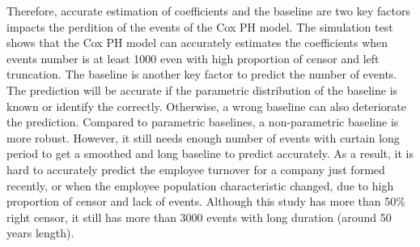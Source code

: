\documentclass[12pt,letterpaper]{article}
\begin{document}
Therefore, accurate estimation of coefficients and the baseline are two key factors impacts the perdition of the events of the Cox PH model. The simulation test shows that the Cox PH model can accurately estimates the coefficients when events number is at least 1000 even with high proportion of censor and left truncation. The baseline is another key factor to predict the number of events. The prediction will be accurate if the parametric distribution of the baseline is known or identify the correctly. Otherwise, a wrong baseline can also deteriorate the prediction. Compared to parametric baselines, a non-parametric baseline is more robust. However, it still needs enough number of events with curtain long period to get a smoothed and long baseline to predict accurately. As a result, it is hard to accurately predict the employee turnover for a company just formed recently, or when the employee population characteristic changed, due to high proportion of censor and lack of events. Although this study has more than 50\% right censor, it still has more than 3000 events with long duration (around 50 years length).






%

\end{document}
